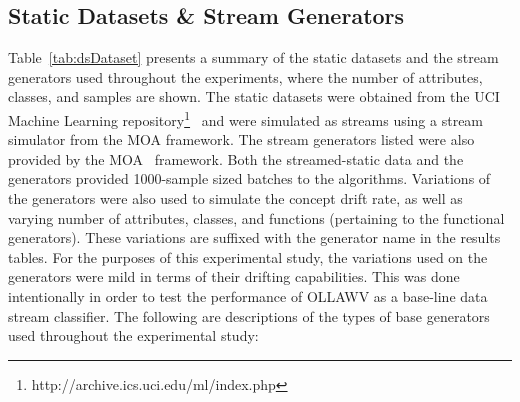 \documentclass[reqno]{vcuthesis}
\numberwithin{equation}{chapter}
\begin{document}
\subsection{Static Datasets \& Stream Generators}
Table~\ref{tab:dsDataset} presents a summary of the static datasets and the stream generators used throughout the experiments, where the number of attributes, classes, and samples are shown. The static datasets were obtained from the UCI Machine Learning repository\footnote{http://archive.ics.uci.edu/ml/index.php}~\cite{Lichman:2013} and were simulated as streams using a stream simulator from the MOA framework. The stream generators listed were also provided by the MOA~\cite{moacite} framework. Both the streamed-static data and the generators provided 1000-sample sized batches to the algorithms. Variations of the generators were also used to simulate the concept drift rate, as well as varying number of attributes, classes, and functions (pertaining to the functional generators). These variations are suffixed with the generator name in the results tables. For the purposes of this experimental study, the variations used on the generators were mild in terms of their drifting capabilities. This was done intentionally in order to test the performance of OLLAWV as a base-line data stream classifier. The following are descriptions of the types of base generators used throughout the experimental study:
\end{document}
